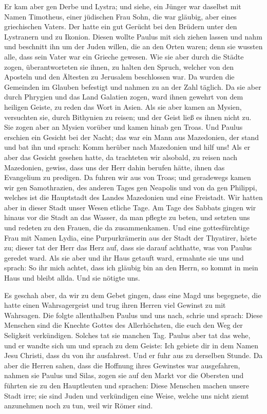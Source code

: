  Er kam aber gen Derbe und Lystra; und siehe, ein Jünger
war daselbst mit Namen Timotheus, einer jüdischen Frau Sohn, die war
gläubig, aber eines griechischen Vaters.  Der hatte ein
gut Gerücht bei den Brüdern unter den Lystranern und zu Ikonion.
 Diesen wollte Paulus mit sich ziehen lassen und nahm und
beschnitt ihn um der Juden willen, die an den Orten waren; denn sie
wussten alle, dass sein Vater war ein Grieche gewesen. 
Wie sie aber durch die Städte zogen, überantworteten sie ihnen, zu
halten den Spruch, welcher von den Aposteln und den Ältesten zu
Jerusalem beschlossen war.  Da wurden die Gemeinden im
Glauben befestigt und nahmen zu an der Zahl täglich.  Da
sie aber durch Phrygien und das Land Galatien zogen, ward ihnen gewehrt
von dem heiligen Geiste, zu reden das Wort in Asien.  Als
sie aber kamen an Mysien, versuchten sie, durch Bithynien zu reisen; und
der Geist ließ es ihnen nicht zu.  Sie zogen aber an
Mysien vorüber und kamen hinab gen Troas.  Und Paulus
erschien ein Gesicht bei der Nacht; das war ein Mann aus Mazedonien, der
stand und bat ihn und sprach: Komm herüber nach Mazedonien und hilf uns!
 Als er aber das Gesicht gesehen hatte, da trachteten wir
alsobald, zu reisen nach Mazedonien, gewiss, dass uns der Herr dahin
berufen hätte, ihnen das Evangelium zu predigen.  Da
fuhren wir aus von Troas; und geradewegs kamen wir gen Samothrazien, des
anderen Tages gen Neapolis  und von da gen Philippi,
welches ist die Hauptstadt des Landes Mazedonien und eine Freistadt. Wir
hatten aber in dieser Stadt unser Wesen etliche Tage.  Am
Tage des Sabbats gingen wir hinaus vor die Stadt an das Wasser, da man
pflegte zu beten, und setzten uns und redeten zu den Frauen, die da
zusammenkamen.  Und eine gottesfürchtige Frau mit Namen
Lydia, eine Purpurkrämerin aus der Stadt der Thyatirer, hörte zu; dieser
tat der Herr das Herz auf, dass sie darauf achthatte, was von Paulus
geredet ward.  Als sie aber und ihr Haus getauft ward,
ermahnte sie uns und sprach: So ihr mich achtet, dass ich gläubig bin an
den Herrn, so kommt in mein Haus und bleibt allda. Und sie nötigte uns.

 Es geschah aber, da wir zu dem Gebet gingen, dass eine
Magd uns begegnete, die hatte einen Wahrsagergeist und trug ihren Herren
viel Gewinst zu mit Wahrsagen.  Die folgte allenthalben
Paulus und uns nach, schrie und sprach: Diese Menschen sind die Knechte
Gottes des Allerhöchsten, die euch den Weg der Seligkeit verkündigen.
 Solches tat sie manchen Tag. Paulus aber tat das wehe,
und er wandte sich um und sprach zu dem Geiste: Ich gebiete dir in dem
Namen Jesu Christi, dass du von ihr ausfahrest. Und er fuhr aus zu
derselben Stunde.  Da aber die Herren sahen, dass die
Hoffnung ihres Gewinstes war ausgefahren, nahmen sie Paulus und Silas,
zogen sie auf den Markt vor die Obersten  und führten sie
zu den Hauptleuten und sprachen: Diese Menschen machen unsere Stadt
irre; sie sind Juden  und verkündigen eine Weise, welche
uns nicht ziemt anzunehmen noch zu tun, weil wir Römer sind.

